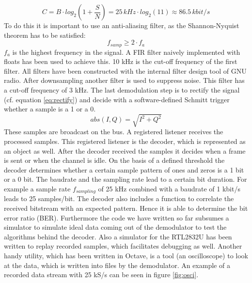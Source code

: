 \documentclass[conference]{IEEEtran}
\begin{document}
\begin{equation}
	\label{eq:awgn}
	C=B \cdot log_2(1+\frac{S}{N})= 25\,kHz \cdot log_2(11) \approx 86.5\,kbit/s
\end{equation}     
To do this it is important to use an anti-aliasing filter, as the Shannon-Nyquist theorem has to be satisfied: 
\begin{equation}
	\label{eq:nyquist}
	f_{samp} \geq 2 \cdot f_{a}
\end{equation}
\ensuremath{f_{a}} is the highest frequency in the signal. 
A FIR filter naively implemented with floats has been used to achieve this. 10 kHz is the cut-off frequency of the first filter. All filters have been constructed with the internal filter design tool of GNU radio. After downsampling another filter is used to suppress noise. This filter has a cut-off frequency of 3 kHz. The last demodulation step is to rectify the signal (cf. equation \ref{eq:rectify}) and decide with a software-defined Schmitt trigger whether a sample is a 1 or a 0.
\begin{equation}
	\label{eq:rectify}
	abs(I,Q) = \sqrt{I^2 +  Q^2}
\end{equation} 
These samples are broadcast on the bus. A registered listener receives the processed samples. This registered listener is the decoder, which is represented as an object as well. After the decoder received the samples it decides when a frame is sent or when the channel is idle. On the basis of a defined threshold the decoder determines whether a certain sample pattern of ones and zeros is a 1 bit or a 0 bit. The baudrate and the sampling rate lead to a certain bit duration. For example a sample rate \ensuremath{f_{sampling}} of 25 kHz combined with a baudrate of 1 kbit/s leads to 25 samples/bit. The decoder also includes a function to correlate the received bitstream with an expected pattern. Hence it is able to determine the bit error ratio (BER). 
Furthermore the code we have written so far subsumes a simulator to simulate ideal data coming out of the demodulator to test the algorithms behind the decoder. Also a simulator for the RTL2832U has been written to replay recorded samples, which facilitates debugging as well.    
Another handy utility, which has been written in Octave, is a tool (an oscilloscope) to look at the data, which is written into files by the demodulator. An example of a recorded data stream with 25 kS/s can be seen in figure \ref{fig:osci}. 
\end{document}
